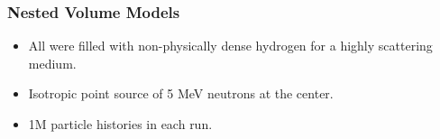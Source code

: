 \documentclass[12pt]{beamer}
\begin{document}
\begin{frame}
\frametitle{Nested Volume Models}
\begin{itemize}
\item All were filled with non-physically dense hydrogen for a highly scattering medium. 
\item Isotropic point source of 5 MeV neutrons at the center.
\item 1M particle histories in each run.
\end{itemize}

\begin{center}
\end{center}
\end{frame}
\end{document}
